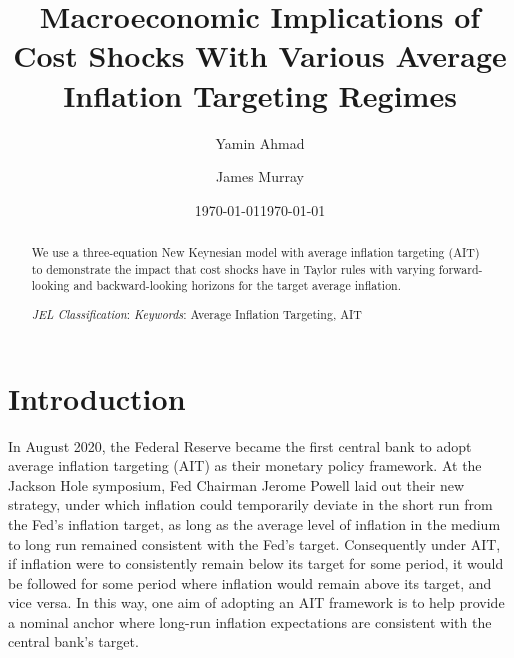 \documentclass[english,authoryear,12pt]{elsarticle}
\begin{document}
	\begin{frontmatter}
		\title{Macroeconomic Implications of Cost Shocks With Various Average Inflation Targeting Regimes}
		\date{\today}
		\author[1]{Yamin Ahmad}
		\author[2]{James Murray}
		
		\address[1]{Dept. of Economics, University of Wisconsin - Whitewater, 809 W. Starin Road, Whitewater, WI 53190, USA}
		\address[2]{Dept. of Economics, University of Wisconsin - La Crosse, 1725 State St., La Crosse, WI 53190, USA}		
	
	\date{\today}
	
	\begin{abstract}
		We use a three-equation New Keynesian model with average inflation targeting (AIT) to demonstrate the impact that cost shocks have in Taylor rules with varying forward-looking and backward-looking horizons for the target average inflation.
		
		\begin{flushleft}
			{\it JEL Classification}:  \newline
			{\it Keywords}: Average Inflation Targeting, AIT
		\end{flushleft}
	\end{abstract}
	
\end{frontmatter}

\renewcommand{\thefootnote}{\arabic{footnote}}%
\setcounter{page}{1}%
\setcounter{footnote}{0}%


\section{\label{Intro}Introduction}
In August 2020, the Federal Reserve became the first central bank to adopt average inflation targeting (AIT) as their monetary policy framework. At the Jackson Hole symposium, Fed Chairman Jerome Powell laid out their new strategy, under which inflation could temporarily deviate in the short run from the Fed's inflation target, as long as the average level of inflation in the medium to long run remained consistent with the Fed's target. Consequently under AIT, if inflation were to consistently remain below its target for some period, it would be followed for some period where inflation would remain above its target, and vice versa. In this way, one aim of adopting an AIT framework is to help provide a nominal anchor where long-run inflation expectations are consistent with the central bank's target. 
\end{document}
